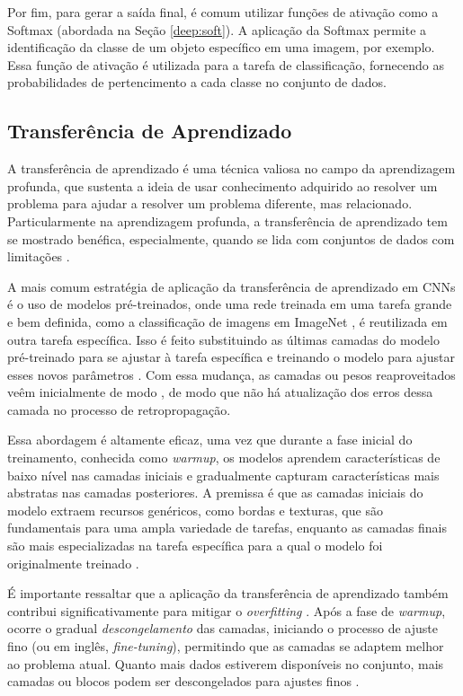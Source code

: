 Por fim, para gerar a saída final, é comum utilizar funções de ativação como a Softmax (abordada na Seção \ref{deep:soft}). A aplicação da Softmax permite a identificação da classe de um objeto específico em uma imagem, por exemplo. Essa função de ativação é utilizada para a tarefa de classificação, fornecendo as probabilidades de pertencimento a cada classe no conjunto de dados.

\subsection{Transferência de Aprendizado}
\label{cnn:transfer}

A transferência de aprendizado é uma técnica valiosa no campo da aprendizagem profunda, que sustenta a ideia de usar conhecimento adquirido ao resolver um problema para ajudar a resolver um problema diferente, mas relacionado. Particularmente na aprendizagem profunda, a transferência de aprendizado tem se mostrado benéfica, especialmente, quando se lida com conjuntos de dados com limitações \citep{Pan2010}.

A mais comum estratégia de aplicação da transferência de aprendizado em CNNs é o uso de modelos pré-treinados, onde uma rede treinada em uma tarefa grande e bem definida, como a classificação de imagens em ImageNet \citep{Deng2009ImageNet:Database}, é reutilizada em outra tarefa específica. Isso é feito substituindo as últimas camadas do modelo pré-treinado para se ajustar à tarefa específica e treinando o modelo para ajustar esses novos parâmetros \citep{Yosinski2014HowNetworks}. Com essa mudança, as camadas ou pesos reaproveitados veêm inicialmente de modo , de modo que não há atualização dos erros dessa camada no processo de retropropagação.

Essa abordagem é altamente eficaz, uma vez que durante a fase inicial do treinamento, conhecida como \textit{warmup}, os modelos aprendem características de baixo nível nas camadas iniciais e gradualmente capturam características mais abstratas nas camadas posteriores. A premissa é que as camadas iniciais do modelo extraem recursos genéricos, como bordas e texturas, que são fundamentais para uma ampla variedade de tarefas, enquanto as camadas finais são mais especializadas na tarefa específica para a qual o modelo foi originalmente treinado \citep{Yosinski2014HowNetworks}.

É importante ressaltar que a aplicação da transferência de aprendizado também contribui significativamente para mitigar o \textit{overfitting} \citep{Geron2017Hands-onSystems}. Após a fase de \textit{warmup}, ocorre o gradual \textit{descongelamento} das camadas, iniciando o processo de ajuste fino (ou em inglês, \textit{fine-tuning}), permitindo que as camadas se adaptem melhor ao problema atual. Quanto mais dados estiverem disponíveis no conjunto, mais camadas ou blocos podem ser descongelados para ajustes finos \citep{Geron2017Hands-onSystems}.

